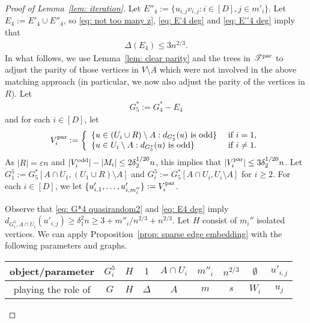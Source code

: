 \documentclass[a4paper, 11pt, reqno]{amsart}
\numberwithin{equation}{section}
\newcommand{\1}{{\rm 1\hspace*{-0.4ex}%
\rule{0.1ex}{1.52ex}\hspace*{0.2ex}}}
\newcommand{\sT}{\mathscr{T}}
\newcommand{\p}{{\rm par}}
\renewcommand{\epsilon}{\varepsilon}
\newcommand{\sm}{\setminus}
\begin{document}
\begin{proof}[Proof of Lemma~\ref{lem: iteration}]
Let $E''_4:=\{u_{i,j}v_{i,j}: i\in [D], j\in m'_i\}$. 
Let $E_4:=E'_4\cup E''_4$, so \eqref{eq: not too many z}, \eqref{eq: E'4 deg} and \eqref{eq: E''4 deg} imply that
\begin{align}\label{eq: E4 deg}
\Delta(E_4)\leq 3n^{2/3}.
\end{align}
In what follows, we use Lemma~\ref{lem: clear parity} and the trees in $\sT^\p$ to adjust the parity of those vertices in $V\sm A$
which were not involved in the above matching approach (in particular, we now also adjust the parity of the vertices in $R$).
Let 
\begin{align}\label{eq:G5}
	G^*_5:= G^*_4 - E_4
\end{align}
 and
for each $i\in [D]$, let 
$$V^\p_i:= \left\{ \begin{array}{ll}
\{ u\in (U_i\cup R)\setminus A: d_{G^*_5}(u) \text{ is odd}\} &\text{ if }i=1,\\
\{u\in U_i \setminus A : d_{G^*_5}(u) \text{ is odd}\} &\text{ if }i\neq 1.
\end{array}\right.$$
As $|R|= \epsilon n$ and  $|V^{\rm odd}_i|-|M_i|\leq 2\delta^{1/20}_2 n$,
this implies that $|V^{\p}_{i}|\leq 3\delta_2^{1/20} n$.
Let $G^5_1:= G^*_5[A\cap U_1,(U_1\cup R)\sm A]$ and $G^5_i:= G^*_5[A\cap U_i,U_i\sm A]$ for $i\geq 2$. 
For each $i\in [D]$, we let $\{u'_{i,1},\dots, u'_{i,m''_i}\} := V^{\p}_{i}$.

Observe that \eqref{eq: G*4 quasirandom2} and \eqref{eq: E4 deg} imply $d_{G^5_i,A\cap U_i}(u'_{i,j}) 
{\geq} \delta_1^2 n \geq 3+ m''_i/n^{2/3} + n^{2/3}$.
Let $H$ consist of $m_i''$ isolated vertices.
We can apply Proposition~\ref{prop: sparse edge embedding} with the following parameters and graphs.
\newline

\noindent
{
\begin{tabular}{c|c|c|c|c|c|c|c|c}
object/parameter & $G^{5}_i$ & $H$ & $ 1 $ & $A\cap U_i$ &  $m''_i$ & $n^{2/3} $  &  $\emptyset$ & $u'_{i,j}$
\\ \hline
playing the role of & $G$ & $H$ & $\Delta$ & $A$ &  $m$ & $s$ &$W_i$ & $u_j$
\end{tabular}
}\newline \vspace{0.2cm}


\end{proof}
\end{document}
